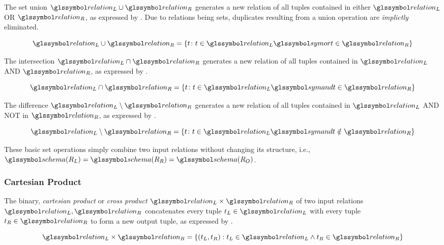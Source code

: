 The set union $\relation_L \cup \relation_R$ generates a new relation of all tuples contained in either $\relation_L$ OR $\relation_R$, as expressed by . Due to relations being sets, duplicates resulting from a union operation are \emph{implictly} eliminated.

\begin{equation}
    \label{equation:rel_op_union}
    \relation_L \cup \relation_R = \{ t \colon t \in \relation_L \symor t \in \relation_R \}
\end{equation}

The intersection $\relation_L \cap \relation_R$ generates a new relation of all tuples contained in $\relation_L$ AND $\relation_R$, as expressed by .

\begin{equation}
    \label{equation:rel_op_intersection}
    \relation_L \cap \relation_R = \{ t \colon t \in \relation_L \symand t \in \relation_R \}
\end{equation}

The difference $\relation_L \setminus \relation_R$ generates a new relation of all tuples contained in $\relation_L$ AND NOT in $\relation_R$, as expressed by .

\begin{equation}
    \label{equation:rel_op_difference}
    \relation_L \setminus \relation_R = \{ t \colon t \in \relation_L \symand t \notin \relation_R \}
\end{equation}

These basic set operations simply combine two input relations without changing its structure, i.e., $\schema(R_{L}) = \schema(R_{R}) =  \schema(R_{O})$. 

\subsubsection{Cartesian Product}
The binary, \emph{cartesian product} or \emph{cross product} $\relation_L \times \relation_R$ of two input relations $\relation_L,\relation_R$ concatenates every tuple $t_{L} \in \relation_L$ with every tuple $t_{R} \in \relation_R$ to form a new output tuple, as expressed by .

\begin{equation}
    \label{equation:rel_op_cartesian}
    \relation_L \times \relation_R = \{ (t_L, t_R) : t_L \in \relation_L \wedge t_R \in \relation_R \}
\end{equation}

